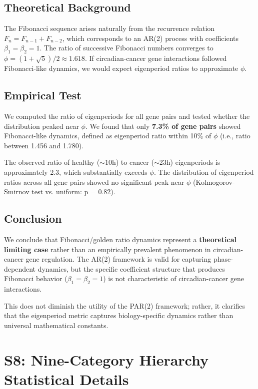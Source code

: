 \documentclass[11pt,a4paper]{article}
\begin{document}
\subsection{Theoretical Background}

The Fibonacci sequence arises naturally from the recurrence relation $F_n = F_{n-1} + F_{n-2}$, which corresponds to an AR(2) process with coefficients $\beta_1 = \beta_2 = 1$. The ratio of successive Fibonacci numbers converges to $\phi = (1 + \sqrt{5})/2 \approx 1.618$. If circadian-cancer gene interactions followed Fibonacci-like dynamics, we would expect eigenperiod ratios to approximate $\phi$.

\subsection{Empirical Test}

We computed the ratio of eigenperiods for all gene pairs and tested whether the distribution peaked near $\phi$. We found that only \textbf{7.3\% of gene pairs} showed Fibonacci-like dynamics, defined as eigenperiod ratio within 10\% of $\phi$ (i.e., ratio between 1.456 and 1.780).

The observed ratio of healthy ($\sim$10h) to cancer ($\sim$23h) eigenperiods is approximately 2.3, which substantially exceeds $\phi$. The distribution of eigenperiod ratios across all gene pairs showed no significant peak near $\phi$ (Kolmogorov-Smirnov test vs. uniform: p = 0.82).

\subsection{Conclusion}

We conclude that Fibonacci/golden ratio dynamics represent a \textbf{theoretical limiting case} rather than an empirically prevalent phenomenon in circadian-cancer gene regulation. The AR(2) framework is valid for capturing phase-dependent dynamics, but the specific coefficient structure that produces Fibonacci behavior ($\beta_1 = \beta_2 = 1$) is not characteristic of circadian-cancer gene interactions.

This does not diminish the utility of the PAR(2) framework; rather, it clarifies that the eigenperiod metric captures biology-specific dynamics rather than universal mathematical constants.

\section{S8: Nine-Category Hierarchy Statistical Details}
\end{document}

